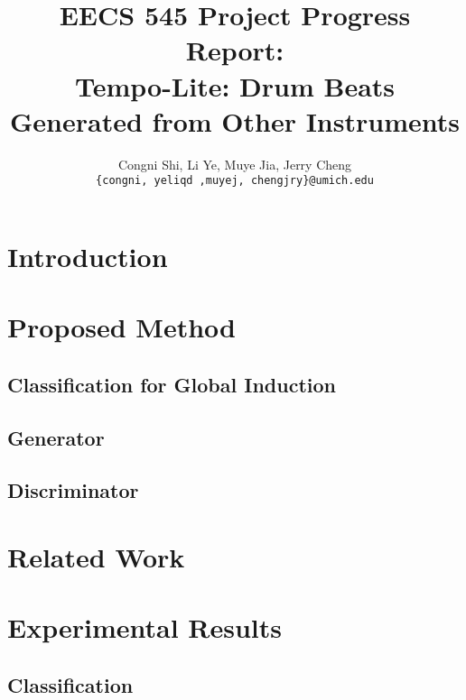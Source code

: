 \documentclass[11pt,letterpaper]{article}
\title{EECS 545 Project Progress Report: \\
        Tempo-Lite: Drum Beats Generated from Other Instruments}
\author{Congni Shi, Li Ye, Muye Jia, Jerry Cheng\\
        \texttt{\{congni, yeliqd ,muyej, chengjry\}@umich.edu}
}
\begin{document}
\maketitle


\section{Introduction}
    \label{sec:introduction}

\section{Proposed Method}
    \label{sec:proposed}

    \subsection{Classification for Global Induction}
        \label{sub:class}

    \subsection{Generator}
    
    \subsection{Discriminator}


\section{Related Work}
    \label{sec:related}

\section{Experimental Results}
    \label{sec:experimental}
    
    \subsection{Classification}
        \label{sub:exp_class}
\end{document}
